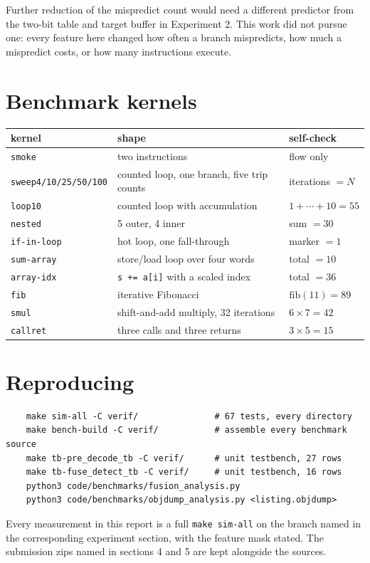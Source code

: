 \documentclass[11pt]{article}
\begin{document}
Further reduction of the mispredict count would need a different predictor from the two-bit
table and target buffer in Experiment 2. This work did not pursue one: every feature here
changed how often a branch mispredicts, how much a mispredict costs, or how many instructions
execute.

\appendix
\section{Benchmark kernels}

\begin{center}
\small
\begin{tabular}{lll}
\toprule
kernel & shape & self-check \\
\midrule
\texttt{smoke}     & two instructions & flow only \\
\texttt{sweep4/10/25/50/100} & counted loop, one branch, five trip counts & iterations $= N$ \\
\texttt{loop10}    & counted loop with accumulation & $1+\cdots+10 = 55$ \\
\texttt{nested}    & 5 outer, 4 inner & sum $= 30$ \\
\texttt{if-in-loop}& hot loop, one fall-through & marker $= 1$ \\
\texttt{sum-array} & store/load loop over four words & total $= 10$ \\
\texttt{array-idx} & \texttt{s += a[i]} with a scaled index & total $= 36$ \\
\texttt{fib}       & iterative Fibonacci & $\mathrm{fib}(11) = 89$ \\
\texttt{smul}      & shift-and-add multiply, 32 iterations & $6 \times 7 = 42$ \\
\texttt{callret}   & three calls and three returns & $3 \times 5 = 15$ \\
\bottomrule
\end{tabular}
\end{center}

\section{Reproducing}

\begin{verbatim}
    make sim-all -C verif/               # 67 tests, every directory
    make bench-build -C verif/           # assemble every benchmark source
    make tb-pre_decode_tb -C verif/      # unit testbench, 27 rows
    make tb-fuse_detect_tb -C verif/     # unit testbench, 16 rows
    python3 code/benchmarks/fusion_analysis.py
    python3 code/benchmarks/objdump_analysis.py <listing.objdump>
\end{verbatim}

Every measurement in this report is a full \texttt{make sim-all} on the branch named in the
corresponding experiment section, with the feature mask stated. The submission zips named in
sections 4 and 5 are kept alongside the sources.
\end{document}
